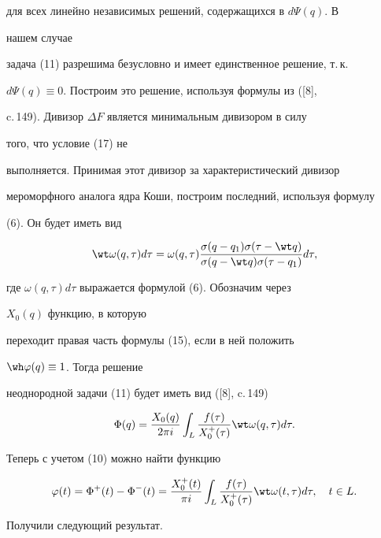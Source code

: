 для всех линейно независимых решений, содержащихся в $d\Psi(q)$. В 


нашем случае 


задача (11) разрешима безусловно и имеет единственное решение, т.\,к. 


$d\Psi(q)\equiv0$. Построим это решение, используя формулы из ([8], 


c.\,149). Дивизор $\Delta F$ является минимальным дивизором в силу 


того, что условие (17) не 


выполняется. Принимая этот дивизор за характеристический дивизор 


мероморфного аналога ядра Коши, построим последний, используя формулу 


(6). Он будет иметь вид 


$$ 


\wt\omega(q,\tau)d\tau=\omega(q,\tau) 


\frac{\sigma(q-q_1)\sigma(\tau-\wt q)} 


{\sigma(q-\wt q)\sigma(\tau-q_1)}d\tau, 


$$ 


где $\omega(q,\tau)d\tau$ выражается формулой (6). Обозначим через 


$X_0(q)$ функцию, в которую 


переходит правая часть формулы (15), если в ней положить 


$\wh\varphi(q)\equiv1$. Тогда решение 


неоднородной задачи (11) будет иметь вид ([8], c.\,149)


$$ 


\Phi(q)=\frac{X_0(q)}{2\pi i}\int_L 


\frac{f(\tau)}{X^+_0(\tau)}\wt\omega(q,\tau)d\tau. 


$$ 


Теперь с учетом (10) можно найти функцию 


\begin{equation} 


\varphi(t)=\Phi^+(t)-\Phi^-(t)= 


\frac{X^+_0(t)}{\pi i}\int_L 


\frac{f(\tau)}{X^+_0(\tau)}\wt\omega(t,\tau)d\tau,\quad t\in L. 


\end{equation} 


Получили следующий результат. 


 


